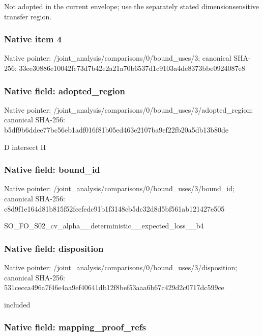 \documentclass[10pt,a4paper]{article}
\begin{document}
Not adopted in the current envelope; use the separately stated dimensionsensitive transfer region.


\subsubsection{Native item 4}


Native pointer: /joint\_analysis/comparis\allowbreak{}ons/0/bound\_uses/3; canonical SHA-256: 33ee30886e10042fc73d7b42\allowbreak{}e2a21a70b6537d1c9103a4dc\allowbreak{}8373bbe0924087e8



\subsubsection{Native field: adopted\_region}


Native pointer: /joint\_analysis/comparis\allowbreak{}ons/0/bound\_uses/3/adopt\allowbreak{}ed\_region; canonical SHA-256: b5df9b6ddee77bc56eb1adf0\allowbreak{}16f81b05ed463e2107ba9ef2\allowbreak{}2fb20a5db13b80de


D intersect H


\subsubsection{Native field: bound\_id}


Native pointer: /joint\_analysis/comparis\allowbreak{}ons/0/bound\_uses/3/bound\allowbreak{}\_id; canonical SHA-256: c8d9f1e164d81b815f52fccf\allowbreak{}edc91b1f3148cb5dc32d8d5b\allowbreak{}f561ab121427e505


SO\_FO\_S02\_cv\_alpha\_\_dete\allowbreak{}rministic\_\_expected\_loss\allowbreak{}\_\_b4


\subsubsection{Native field: disposition}


Native pointer: /joint\_analysis/comparis\allowbreak{}ons/0/bound\_uses/3/dispo\allowbreak{}sition; canonical SHA-256: 531cecca496a7f46e4aa9ef4\allowbreak{}0641db12f8bef53aaa6b67c4\allowbreak{}29d2c0717dc599ce


included


\subsubsection{Native field: mapping\_proof\_refs}
\end{document}
